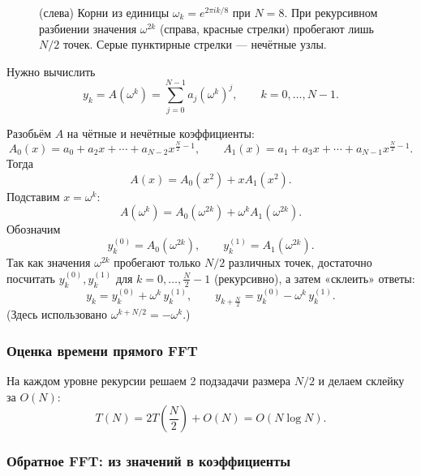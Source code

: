 \begin{figure}[h]
	\caption{(слева) Корни из единицы $\omega_k=e^{2\pi ik/8}$ при $N=8$.
		При рекурсивном разбиении значения $\omega^{2k}$ (справа, красные стрелки)
		пробегают лишь $N/2$ точек.
		Серые пунктирные стрелки — нечётные узлы.}
	\label{fig:roots}
\end{figure}

\bigskip


Нужно вычислить
\[
y_k = A(\omega^k)=\sum_{j=0}^{N-1} a_j(\omega^k)^j,\qquad k=0,\dots,N-1.
\]

Разобьём $A$ на чётные и нечётные коэффициенты:
\[
A_0(x)=a_0+a_2x+\cdots+a_{N-2}x^{\frac{N}{2}-1},
\qquad
A_1(x)=a_1+a_3x+\cdots+a_{N-1}x^{\frac{N}{2}-1}.
\]
Тогда
\[
A(x)=A_0(x^2)+xA_1(x^2).
\]
Подставим $x=\omega^k$:
\[
A(\omega^k)=A_0(\omega^{2k})+\omega^k A_1(\omega^{2k}).
\]
Обозначим
\[
y_k^{(0)}=A_0(\omega^{2k}),\qquad y_k^{(1)}=A_1(\omega^{2k}).
\]
Так как значения $\omega^{2k}$ пробегают только $N/2$ различных точек,
достаточно посчитать $y_k^{(0)},y_k^{(1)}$ для $k=0,\dots,\frac{N}{2}-1$ (рекурсивно),
а затем «склеить» ответы:
\[
y_k = y_k^{(0)} + \omega^k\, y_k^{(1)},
\qquad
y_{k+\frac{N}{2}} = y_k^{(0)} - \omega^k\, y_k^{(1)}.
\]
(Здесь использовано $\omega^{k+N/2}=-\omega^k$.)

\subsubsection*{Оценка времени прямого FFT}

На каждом уровне рекурсии решаем 2 подзадачи размера $N/2$
и делаем склейку за $O(N)$:
\[
T(N)=2T\!\left(\frac{N}{2}\right)+O(N)=O(N\log N).
\]

\subsubsection*{Обратное FFT: из значений в коэффициенты}

